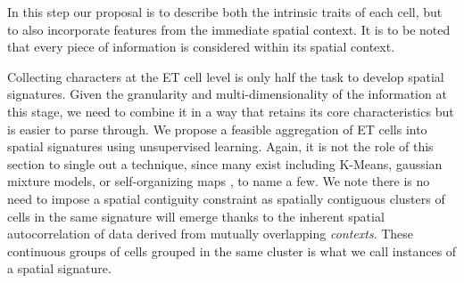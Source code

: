 In this step our proposal is to describe both the
intrinsic traits of each cell, but to also incorporate features from the immediate
spatial context.
%
It is to be noted that
every piece of information is considered within its spatial context.

Collecting characters at the ET cell level is only half the task to develop
spatial signatures. Given the granularity and multi-dimensionality of the
information at this stage, we need to combine it in a way that retains its
core characteristics but is easier to parse through.
%
We propose a feasible aggregation of ET cells into
spatial signatures using unsupervised learning. Again, it is not the role of
this section to single out a technique, since many exist including K-Means,
gaussian mixture models, or self-organizing maps \citep{kohonen1990self}, to
name a few. We note there is no need to impose a spatial contiguity constraint
as spatially contiguous clusters of cells in the same signature will emerge
thanks to the inherent spatial autocorrelation of data derived from mutually
overlapping \textit{contexts}.
%
These continuous groups of cells grouped in the same cluster is what we call
instances of a spatial signature.
